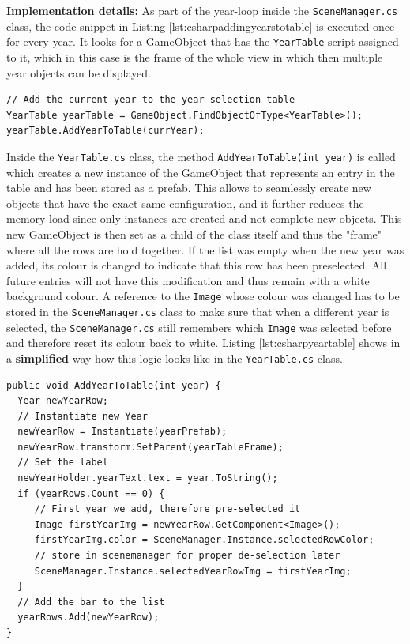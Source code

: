 \textbf{Implementation details:} As part of the year-loop inside the \texttt{SceneManager.cs} class, the code snippet in Listing \ref{lst:csharpaddingyearstotable} is executed once for every year. It looks for a GameObject that has the \texttt{YearTable} script assigned to it, which in this case is the frame of the whole view in which then multiple year objects can be displayed.
\begin{lstlisting}[caption={SceneManager.cs : Adding years to the YearTable}, label={lst:csharpaddingyearstotable}]
// Add the current year to the year selection table
YearTable yearTable = GameObject.FindObjectOfType<YearTable>();
yearTable.AddYearToTable(currYear);
\end{lstlisting}
Inside the \texttt{YearTable.cs} class, the method \texttt{AddYearToTable(int year)} is called which creates a new instance of the GameObject that represents an entry in the table and has been stored as a prefab. This allows to seamlessly create new objects that have the exact same configuration, and it further reduces the memory load since only instances are created and not complete new objects. This new GameObject is then set as a child of the class itself and thus the "frame" where all the rows are hold together. If the list was empty when the new year was added, its colour is changed to indicate that this row has been preselected. All future entries will not have this modification and thus remain with a white background colour. A reference to the \texttt{Image} whose colour was changed has to be stored in the \texttt{SceneManager.cs} class to make sure that when a different year is selected, the \texttt{SceneManager.cs} still remembers which \texttt{Image} was selected before and therefore reset its colour back to white. Listing \ref{lst:csharpyeartable} shows in a \textbf{simplified} way how this logic looks like in the \texttt{YearTable.cs} class.
\begin{lstlisting}[caption={YearTable.cs : Simplification of adding a new year to the table}, label={lst:csharpyeartable}]
public void AddYearToTable(int year) {
  Year newYearRow;
  // Instantiate new Year
  newYearRow = Instantiate(yearPrefab);
  newYearRow.transform.SetParent(yearTableFrame);
  // Set the label
  newYearHolder.yearText.text = year.ToString();
  if (yearRows.Count == 0) {
     // First year we add, therefore pre-selected it
     Image firstYearImg = newYearRow.GetComponent<Image>();
     firstYearImg.color = SceneManager.Instance.selectedRowColor;
     // store in scenemanager for proper de-selection later
     SceneManager.Instance.selectedYearRowImg = firstYearImg;
  }
  // Add the bar to the list
  yearRows.Add(newYearRow);
}
\end{lstlisting}


